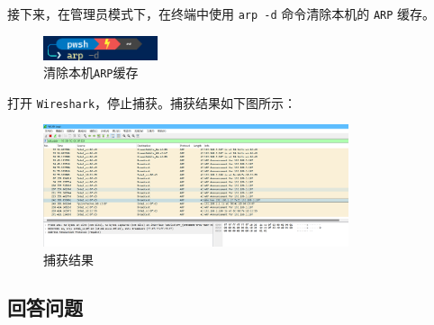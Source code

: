 \documentclass{article}
\begin{document}
接下来，在管理员模式下，在终端中使用 \texttt{arp -d} 命令清除本机的 \texttt{ARP} 缓存。

\begin{figure}[H]
  \centering
  \includegraphics[width=0.3\textwidth]{img/4.png}
  \caption{清除本机\texttt{ARP}缓存}
  \label{fig:4}
\end{figure}

打开 \texttt{Wireshark}，停止捕获。捕获结果如下图所示：

\begin{figure}[H]
  \centering
  \includegraphics[width=0.8\textwidth]{img/5.png}
  \caption{捕获结果}
  \label{fig:5}
\end{figure}

\subsection{回答问题}
\end{document}
